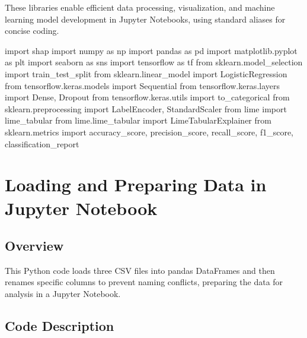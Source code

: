\documentclass[
  letterpaper,
  DIV=11,
  numbers=noendperiod]{scrartcl}
\newenvironment{Shaded}{\begin{snugshade}}{\end{snugshade}}
\newcommand{\ImportTok}[1]{\textcolor[rgb]{0.00,0.46,0.62}{#1}}
\newcommand{\NormalTok}[1]{\textcolor[rgb]{0.00,0.23,0.31}{#1}}
\begin{document}
These libraries enable efficient data processing, visualization, and
machine learning model development in Jupyter Notebooks, using standard
aliases for concise coding.

\begin{Shaded}
\begin{Highlighting}[]
\ImportTok{import}\NormalTok{ shap}
\ImportTok{import}\NormalTok{ numpy }\ImportTok{as}\NormalTok{ np}
\ImportTok{import}\NormalTok{ pandas }\ImportTok{as}\NormalTok{ pd}
\ImportTok{import}\NormalTok{ matplotlib.pyplot }\ImportTok{as}\NormalTok{ plt}
\ImportTok{import}\NormalTok{ seaborn }\ImportTok{as}\NormalTok{ sns}
\ImportTok{import}\NormalTok{ tensorflow }\ImportTok{as}\NormalTok{ tf}
\ImportTok{from}\NormalTok{ sklearn.model\_selection }\ImportTok{import}\NormalTok{ train\_test\_split}
\ImportTok{from}\NormalTok{ sklearn.linear\_model }\ImportTok{import}\NormalTok{ LogisticRegression}
\ImportTok{from}\NormalTok{ tensorflow.keras.models }\ImportTok{import}\NormalTok{ Sequential}
\ImportTok{from}\NormalTok{ tensorflow.keras.layers }\ImportTok{import}\NormalTok{ Dense, Dropout}
\ImportTok{from}\NormalTok{ tensorflow.keras.utils }\ImportTok{import}\NormalTok{ to\_categorical}
\ImportTok{from}\NormalTok{ sklearn.preprocessing }\ImportTok{import}\NormalTok{ LabelEncoder, StandardScaler}
\ImportTok{from}\NormalTok{ lime }\ImportTok{import}\NormalTok{ lime\_tabular}
\ImportTok{from}\NormalTok{ lime.lime\_tabular }\ImportTok{import}\NormalTok{ LimeTabularExplainer}
\ImportTok{from}\NormalTok{ sklearn.metrics }\ImportTok{import}\NormalTok{ accuracy\_score, precision\_score, recall\_score, f1\_score, classification\_report}
\end{Highlighting}
\end{Shaded}

\section{Loading and Preparing Data in Jupyter
Notebook}\label{loading-and-preparing-data-in-jupyter-notebook}

\subsection{Overview}\label{overview-1}

This Python code loads three CSV files into pandas DataFrames and then
renames specific columns to prevent naming conflicts, preparing the data
for analysis in a Jupyter Notebook.

\subsection{Code Description}\label{code-description}
\end{document}
